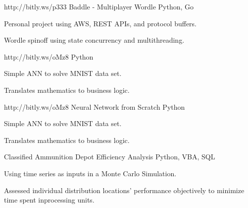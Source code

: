 

\begin{cventries}

  \cventry
    {http://bitly.ws/p333} %
    {Baddle - Multiplayer Wordle} %
    {Python, Go} %
    {} %
    {{
      \begin{cvitems} %
        \item {Personal project using AWS, REST APIs, and protocol buffers. 
                }
        \item {Wordle spinoff using state concurrency and multithreading.
                }
        {}
      \end{cvitems}
    }}
  \cventry
    {http://bitly.ws/oMz8} %
    {} %
    {Python} %
    {} %
    {{
      \begin{cvitems} %
        \item {Simple ANN to solve MNIST data set. 
                }
        \item {Translates mathematics to business logic.
                }
        {}
      \end{cvitems}
    }}
  \cventry
    {http://bitly.ws/oMz8} %
    {Neural Network from Scratch} %
    {Python} %
    {} %
    {{
      \begin{cvitems} %
        \item {Simple ANN to solve MNIST data set. 
                }
        \item {Translates mathematics to business logic.
                }
        {}
      \end{cvitems}
    }}
     
  \cventry
    {Classified} %
    {Ammunition Depot Efficiency Analysis} %
    {Python, VBA, SQL} %
    {} %
    {{
      \begin{cvitems} %
        \item {Using time series as inputs in a Monte Carlo Simulation.
                }
        \item {Assessed individual distribution locations' performance objectively to minimize time spent inprocessing units.
                }
        {}
      \end{cvitems}
    }}
\end{cventries}
